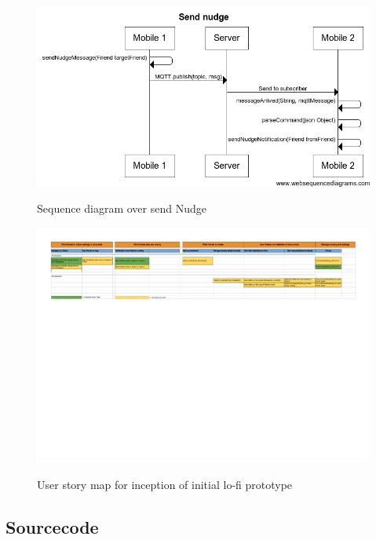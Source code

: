 \documentclass[runningheads,a4paper]{llncs}
\begin{document}
\begin{figure}
\centering
\caption{Sequence diagram over send Nudge}
\includegraphics[scale=0.5]{figures/sq-2}
\label{fig:sq-nudge}
\end{figure}

\begin{landscape}
\begin{figure}
\caption{User story map for inception of initial lo-fi prototype}
\includegraphics{figures/user_story_mapping}
\label{fig:user_story_mapping}
\end{figure}
\restoregeometry
\end{landscape}
\restoregeometry


\subsection*{Sourcecode} \label{source-code}
\lstset{numbers=left,
tabsize=1, numbersep=10pt,
  title=\lstname }

\newpage

\newpage

\newpage

\restoregeometry
\end{document}
